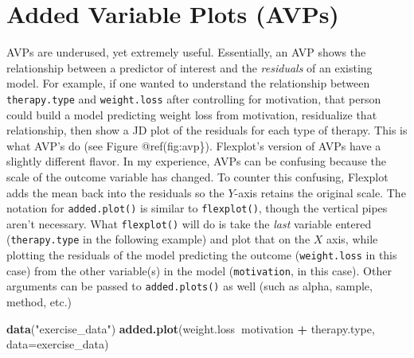 \documentclass[,]{book}
\newenvironment{Shaded}{\begin{snugshade}}{\end{snugshade}}
\newcommand{\KeywordTok}[1]{\textcolor[rgb]{0.13,0.29,0.53}{\textbf{#1}}}
\newcommand{\DataTypeTok}[1]{\textcolor[rgb]{0.13,0.29,0.53}{#1}}
\newcommand{\StringTok}[1]{\textcolor[rgb]{0.31,0.60,0.02}{#1}}
\newcommand{\OperatorTok}[1]{\textcolor[rgb]{0.81,0.36,0.00}{\textbf{#1}}}
\newcommand{\NormalTok}[1]{#1}
\begin{document}
\section*{Added Variable Plots (AVPs)}\label{added-variable-plots-avps}

AVPs are underused, yet extremely useful. Essentially, an AVP shows the
relationship between a predictor of interest and the \emph{residuals} of
an existing model. For example, if one wanted to understand the
relationship between \texttt{therapy.type} and \texttt{weight.loss}
after controlling for motivation, that person could build a model
predicting weight loss from motivation, residualize that relationship,
then show a JD plot of the residuals for each type of therapy. This is
what AVP's do (see Figure @ref(fig:avp\}). Flexplot's version of AVPs
have a slightly different flavor. In my experience, AVPs can be
confusing because the scale of the outcome variable has changed. To
counter this confusing, Flexplot adds the mean back into the residuals
so the \(Y\)-axis retains the original scale. The notation for
\texttt{added.plot()} is similar to \texttt{flexplot()}, though the
vertical pipes aren't necessary. What \texttt{flexplot()} will do is
take the \emph{last} variable entered (\texttt{therapy.type} in the
following example) and plot that on the \(X\) axis, while plotting the
residuals of the model predicting the outcome (\texttt{weight.loss} in
this case) from the other variable(s) in the model (\texttt{motivation},
in this case). Other arguments can be passed to \texttt{added.plots()}
as well (such as alpha, sample, method, etc.)

\begin{Shaded}
\begin{Highlighting}[]
\KeywordTok{data}\NormalTok{(}\StringTok{"exercise_data"}\NormalTok{)}
\KeywordTok{added.plot}\NormalTok{(weight.loss}\OperatorTok{~}\NormalTok{motivation }\OperatorTok{+}\StringTok{ }\NormalTok{therapy.type, }\DataTypeTok{data=}\NormalTok{exercise_data)}
\end{Highlighting}
\end{Shaded}
\end{document}
